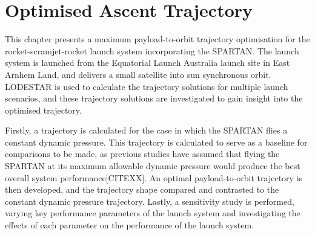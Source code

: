 
\cleardoublepage
\chapter{Optimised Ascent Trajectory}\label{chapter:Ascent}

This chapter presents a maximum payload-to-orbit trajectory optimisation for the rocket-scramjet-rocket launch system incorporating the SPARTAN. 
The launch system is launched from the Equatorial Launch Australia launch site in East Arnhem Land, and delivers a small satellite into sun synchronous orbit. LODESTAR is used to calculate the trajectory solutions for multiple launch scenarios, and these trajectory solutions are investigated to gain insight into the optimised trajectory.

Firstly, a trajectory is calculated for the case in which the SPARTAN flies a constant dynamic pressure. This trajectory is calculated to serve as a baseline for comparisons to be made, as previous studies have assumed that flying the SPARTAN at its maximum allowable dynamic pressure would produce the best overall system performance[CITEXX]. An optimal payload-to-orbit trajectory is then developed, and the trajectory shape compared and contrasted to the constant dynamic pressure trajectory. Lastly, a sensitivity study is performed, varying key performance parameters of the launch system and investigating the effects of each parameter on the performance of the launch system. 

